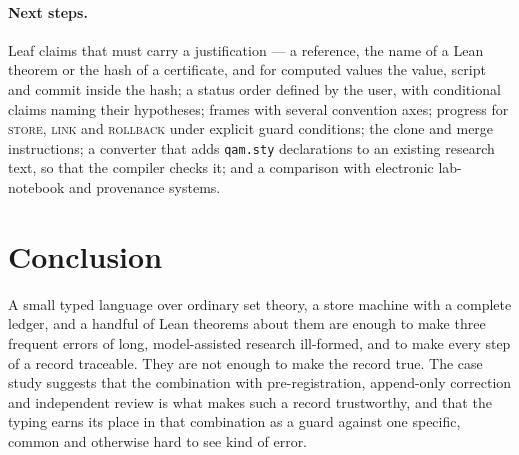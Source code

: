 \paragraph{Next steps.}  Leaf claims that must carry a justification --- a reference, the name of a Lean theorem or the hash of a
certificate, and for computed values the value, script and commit inside the hash; a status order defined by the user, with conditional
claims naming their hypotheses; frames with several convention axes; progress for \textsc{store}, \textsc{link} and \textsc{rollback} under explicit guard conditions; the clone and merge
instructions; a converter that adds \texttt{qam.sty} declarations to an existing research text, so that the compiler checks it; and a comparison with electronic lab-notebook and
provenance systems.

\section{Conclusion}\label{sec:conclusion}

A small typed language over ordinary set theory, a store machine with a complete ledger, and a handful of Lean theorems about them are enough to
make three frequent errors of long, model-assisted research ill-formed, and to make every step of a record traceable.  They are not enough to
make the record true.  The case study suggests that the combination with pre-registration, append-only correction and independent review is what
makes such a record trustworthy, and that the typing earns its place in that combination as a guard against one specific, common and otherwise
hard to see kind of error.
